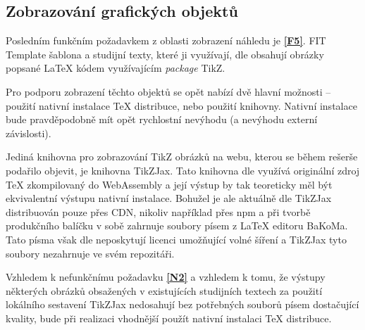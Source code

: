 \subsection{Zobrazování grafických objektů}

Posledním funkčním požadavkem z oblasti zobrazení náhledu je \textbf{\ref{F5}}. FIT Template šablona a studijní texty,
které ji využívají, dle \cite{woowoo, pkm} obsahují obrázky popsané \LaTeX{} kódem využívajícím \textit{package} TikZ.

Pro podporu zobrazení těchto objektů se opět nabízí dvě hlavní možnosti – použití nativní instalace \TeX{} distribuce,
nebo použití knihovny. Nativní instalace bude pravděpodobně mít opět rychlostní nevýhodu (a nevýhodu externí
závislosti).

Jediná knihovna pro zobrazování TikZ obrázků na webu, kterou se během rešerše podařilo objevit, je knihovna TikZJax.
Tato knihovna dle \cite{tikzjax-github} využívá originální zdroj \TeX{} zkompilovaný do WebAssembly a její výstup by tak
teoreticky měl být ekvivalentní výstupu nativní instalace. Bohužel je ale aktuálně dle \cite{tikzjax-github} TikZJax
distribuován pouze přes CDN, nikoliv například přes npm a při tvorbě produkčního balíčku v sobě zahrnuje soubory písem z
\LaTeX{} editoru BaKoMa. Tato písma však dle \cite{bakoma-fonts-ctan} neposkytují licenci umožňující volné šíření a
TikZJax tyto soubory nezahrnuje \cite{tikzjax-github} ve svém repozitáři.

Vzhledem k nefunkčnímu požadavku \textbf{\ref{N2}} a vzhledem k tomu, že výstupy některých obrázků obsažených v
existujících studijních textech \cite{pkm} za použití lokálního sestavení TikZJax nedosahují bez potřebných souborů
písem dostačující kvality, bude při realizaci vhodnější použít nativní instalaci \TeX{} distribuce.
